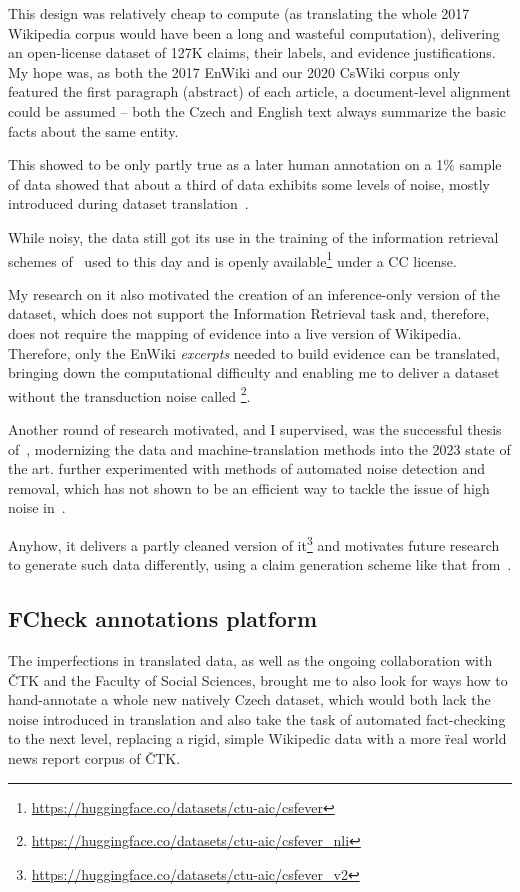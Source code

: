 This design was relatively cheap to compute (as translating the whole 2017 Wikipedia corpus would have been a long and wasteful computation), delivering an open-license dataset of 127K claims, their labels, and evidence justifications. My hope was, as both the 2017 EnWiki and our 2020 CsWiki corpus only featured the first paragraph (abstract) of each article, a document-level alignment could be assumed -- both the Czech and English text always summarize the basic facts about the same entity.

This showed to be only partly true as a later human annotation on a 1\% sample of \FCZ data showed that about a third of data exhibits some levels of noise, mostly introduced during dataset translation~\cite{lrev}.

While noisy, the \FCZ data still got its use in the training of the information retrieval schemes of~\cite{rypar, gazo, lrev} used to this day and is openly available\footnote{\url{https://huggingface.co/datasets/ctu-aic/csfever}} under a CC license.

My research on it also motivated the creation of an inference-only version of the dataset, which does not support the Information Retrieval task and, therefore, does not require the mapping of evidence into a live version of Wikipedia.
Therefore, only the EnWiki \textit{excerpts} needed to build evidence can be translated, bringing down the computational difficulty and enabling me to deliver a dataset without the transduction noise called \FCZNLI\footnote{\url{https://huggingface.co/datasets/ctu-aic/csfever_nli}}. 

Another round of research \FCZ motivated, and I supervised, was the successful thesis of~\cite{mlynar}, modernizing the data and machine-translation methods into the 2023 state of the art.
\cite{mlynar} further experimented with methods of automated noise detection and removal, which has not shown to be an efficient way to tackle the issue of high noise in \FCZ.

Anyhow, it delivers a partly cleaned version of it\footnote{\url{https://huggingface.co/datasets/ctu-aic/csfever_v2}} and motivates future research to generate such data differently, using a claim generation scheme like that from~\cite{pan2021zeroshot}.


\subsection{FCheck annotations platform}
The imperfections in translated \FCZ data, as well as the ongoing collaboration with ČTK and the Faculty of Social Sciences, brought me to also look for ways how to hand-annotate a whole new natively Czech dataset, which would both lack the noise introduced in translation and also take the task of automated fact-checking to the next level, replacing a rigid, simple Wikipedic data with a more \"{real world} news report corpus of ČTK.

